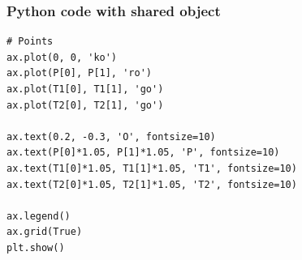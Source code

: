 \documentclass{beamer}
\begin{document}
\begin{frame}[fragile]
\frametitle{Python code with shared object}
\begin{lstlisting}
# Points
ax.plot(0, 0, 'ko')
ax.plot(P[0], P[1], 'ro')
ax.plot(T1[0], T1[1], 'go')
ax.plot(T2[0], T2[1], 'go')

ax.text(0.2, -0.3, 'O', fontsize=10)
ax.text(P[0]*1.05, P[1]*1.05, 'P', fontsize=10)
ax.text(T1[0]*1.05, T1[1]*1.05, 'T1', fontsize=10)
ax.text(T2[0]*1.05, T2[1]*1.05, 'T2', fontsize=10)

ax.legend()
ax.grid(True)
plt.show()
\end{lstlisting}
\end{frame}
\end{document}
